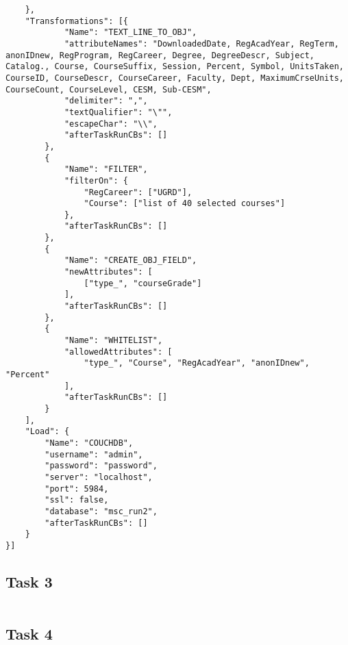 \begin{verbatim}
    },
    "Transformations": [{
            "Name": "TEXT_LINE_TO_OBJ",
            "attributeNames": "DownloadedDate, RegAcadYear, RegTerm, anonIDnew, RegProgram, RegCareer, Degree, DegreeDescr, Subject, Catalog., Course, CourseSuffix, Session, Percent, Symbol, UnitsTaken, CourseID, CourseDescr, CourseCareer, Faculty, Dept, MaximumCrseUnits, CourseCount, CourseLevel, CESM, Sub-CESM",
            "delimiter": ",",
            "textQualifier": "\"",
            "escapeChar": "\\",
            "afterTaskRunCBs": []
        },
        {
            "Name": "FILTER",
            "filterOn": {
                "RegCareer": ["UGRD"],
                "Course": ["list of 40 selected courses"]
            },
            "afterTaskRunCBs": []
        },
        {
            "Name": "CREATE_OBJ_FIELD",
            "newAttributes": [
                ["type_", "courseGrade"]
            ],
            "afterTaskRunCBs": []
        },
        {
            "Name": "WHITELIST",
            "allowedAttributes": [
                "type_", "Course", "RegAcadYear", "anonIDnew", "Percent"
            ],
            "afterTaskRunCBs": []
        }
    ],
    "Load": {
        "Name": "COUCHDB",
        "username": "admin",
        "password": "password",
        "server": "localhost",
        "port": 5984,
        "ssl": false,
        "database": "msc_run2",
        "afterTaskRunCBs": []
    }
}]
\end{verbatim}

\subsection{Task 3}
\label{netl-task3-config}
\begin{verbatim}
\end{verbatim}

\subsection{Task 4}
\label{netl-task4-config}
\begin{verbatim}
\end{verbatim}